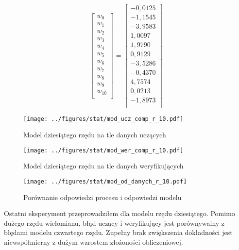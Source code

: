 \documentclass[a4paper,titlepage,11pt,floatssmall]{mwrep}
\begin{document}
$$
\left[\begin{array}{c}
w_0 \\
w_1 \\
w_2 \\
w_3 \\
w_4 \\
w_5 \\
w_6 \\
w_7 \\
w_8 \\
w_9 \\
w_{10} \\
\end{array} \right]
= 
\left[\begin{array}{c}
-0,0125	\\
-1,1545 \\
-3,9583 \\
1,0097 \\
1,9790 \\
0,9129 \\
-3,5286 \\
-0,4370 \\
4,7574 \\
0,0213 \\
-1,8973 \\
\end{array} \right]
$$

\newpage

\begin{figure}[H]
\centering
\texttt{[image: ../figures/stat/mod\_ucz\_comp\_r\_10.pdf]}
\caption{Model dziesiątego rzędu na tle danych uczących}
\end{figure}

\begin{figure}[H]
\centering
\texttt{[image: ../figures/stat/mod\_wer\_comp\_r\_10.pdf]}
\caption{Model dziesiątego rzędu na tle danych weryfikujących}
\end{figure}

\newpage

\begin{figure}[H]
\centering
\texttt{[image: ../figures/stat/mod\_od\_danych\_r\_10.pdf]}
\caption{Porównanie odpowiedzi procesu i odpowiedzi modelu}
\end{figure}

Ostatni eksperyment przeprowadziłem dla modelu rzędu dziesiątego. Pomimo dużego rzędu wielomianu, błąd uczący i weryfikujący jest porównywalny z błędami modelu czwartego rzędu. Zupełny brak zwiększenia dokładności jest niewspółmierny z dużym wzrostem złożoności obliczeniowej. 
\end{document}
